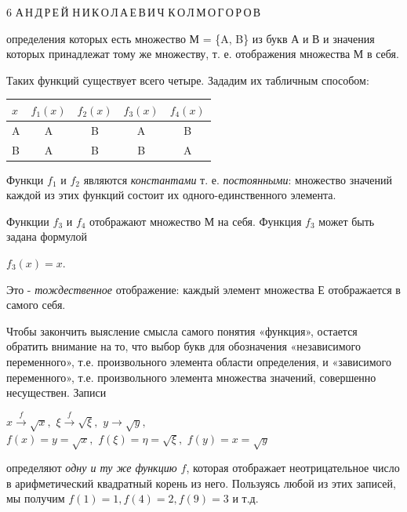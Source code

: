 \begin{center}
 \vspace{-3cm}
    \huge{6}
    \noindent\makebox[\linewidth]{\rule{\paperwidth}{0.4pt}}
    \small
    \small{А\,Н\,Д\,Р\,Е\,Й Н\,И\,К\,О\,Л\,А\,Е\,В\,И\,Ч К\,О\,Л\,М\,О\,Г\,О\,Р\,О\,В}
\end{center}
\vspace{1cm}

\begin{minipage}{0.45\textwidth}
  определения которых есть множество М = \{A, B\} из букв А и В и значения которых принадлежат тому же множеству, т. е. отображения множества М в себя.
  
 \parindent=0.5cm Таких функций существует всего четыре. Зададим их табличным способом:
\begin{center}
\begin{tabular}{|p{0.9cm}|c|c|c|c|}
\hline
     $x$ & $f_1(x)$ & $f_2(x)$ & $f_3(x)$ & $f_4(x)$ \\ \hline
     A & A & B & A & B \\ \hline
     B & A & B & B & A \\
\hline
\end{tabular}
\end{center}

 \parindent=0.5cm Функци $f_1$ и $f_2$  являются {\it константами} т. е. {\it постоянными}: множество значений каждой из этих функций состоит их одного-единственного элемента.
 
 \parindent=0.5cm Функции $f_3$ и $f_4$ отображают множество М на себя. Функция $f_3$ может быть задана формулой 
\begin{center}
$f_3(x) = x.$
\end{center}

 \parindent=0.5cm Это - {\it тождественное} отображение: каждый элемент множества Е отображается в самого себя.
 
 \parindent=0.5cm Чтобы закончить выясление смысла самого понятия «функция», остается обратить внимание на то, что выбор букв для обозначения «независимого переменного», т.е. произвольного элемента области определения, и «зависимого переменного», т.е. произвольного элемента множества значений, совершенно несуществен. Записи
\begin{center}
$x \xrightarrow{f} \sqrt{x},$   $\xi \xrightarrow{f} \sqrt{\xi},$ $y \rightarrow{} \sqrt{y},$ \\
\bigskip
$f(x) = y = \sqrt{x},$ $f(\xi) = \eta = \sqrt{\xi},$ $f(y) = x = \sqrt{y}$
\end{center}
определяют {\it одну и ту же функцию $f$}, которая отображает неотрицательное число в арифметический квадратный корень из него. Пользуясь любой из этих записей, мы получим $f(1)=1, f(4)=2, f(9)=3$ и т.д.
\begin{center}
    

\end{center}
\end{minipage}
